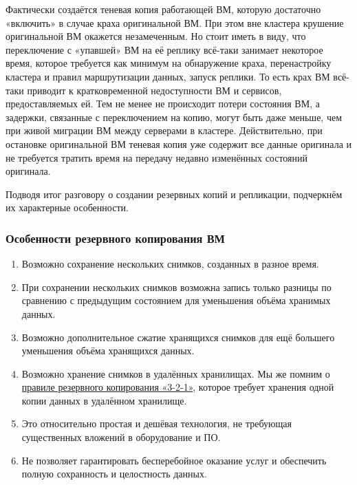 \documentclass[14pt, a4paper]{article}
\begin{document}
Фактически создаётся теневая копия работающей ВМ, которую достаточно «включить» в случае краха
оригинальной ВМ. При этом вне кластера крушение оригинальной ВМ окажется незамеченным. Но
стоит иметь в виду, что переключение с «упавшей» ВМ на её реплику всё-таки занимает некоторое
время, которое требуется как минимум на обнаружение краха, перенастройку кластера и правил
маршрутизации данных, запуск реплики. То есть крах ВМ всё-таки приводит к кратковременной
недоступности ВМ и сервисов, предоставляемых ей. Тем не менее не происходит потери состояния
ВМ, а задержки, связанные с переключением на копию, могут быть даже меньше, чем при живой
миграции ВМ между серверами в кластере. Действительно, при остановке оригинальной ВМ теневая
копия уже содержит все данные оригинала и не требуется тратить время на передачу недавно
изменённых состояний оригинала.

Подводя итог разговору о создании резервных копий и репликации, подчеркнём их характерные
особенности.\\

\subsubsection*{Особенности резервного копирования ВМ}

\begin{enumerate}
    \item Возможно сохранение нескольких снимков, созданных в разное время.
    \item При сохранении нескольких снимков возможна запись только разницы по сравнению с
    предыдущим состоянием для уменьшения объёма хранимых данных.
    \item Возможно дополнительное сжатие хранящихся снимков для ещё большего уменьшения
    объёма хранящихся данных.
    \item Возможно хранение снимков в удалённых хранилищах. Мы же помним о \href{https://habr.com/ru/company/veeam/blog/188544/}{правиле резервного
    копирования «3-2-1»}, которое требует хранения одной копии данных в удалённом хранилище.
    \item Это относительно простая и дешёвая технология, не требующая существенных вложений в
    оборудование и ПО.
    \item Не позволяет гарантировать бесперебойное оказание услуг и обеспечить полную сохранность
    и целостность данных.\\
\end{enumerate}
\end{document}
